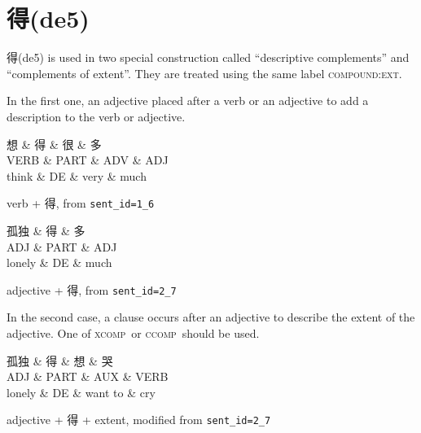 \documentclass[UTF8,oneside]{book}
\def\ccomp{\textsc{ccomp}}
\def\xcomp{\textsc{xcomp}}
\begin{document}
\newpage
\section{得(de5)}

得(de5) is used in two special construction called ``descriptive complements'' and ``complements of extent''. They are treated using the same label \textsc{compound:ext}.

In the first one, an adjective placed after a verb or an adjective to add a description to the verb or adjective. 

\begin{tree}[h]
\centering
\begin{dependency}[theme=simple]
\begin{deptext}[column sep=.5cm, row sep=.5ex]
想  \& 得 \& 很 \& 多 \\
VERB \& PART \& ADV \& ADJ \\
think \& DE \& very \& much \\
\end{deptext}
\end{dependency}
\caption{verb + 得, from \texttt{sent\_id=1\_6}}
\end{tree}

\begin{tree}[h]
\centering
\begin{dependency}[theme=simple]
\begin{deptext}[column sep=.5cm, row sep=.5ex]
孤独  \& 得 \& 多 \\
ADJ \& PART \& ADJ \\
lonely \& DE \& much \\
\end{deptext}
\end{dependency}
\caption{adjective + 得, from \texttt{sent\_id=2\_7}}
\end{tree}

In the second case, a clause occurs after an adjective to describe the extent of the adjective. One of \xcomp\ or \ccomp\ should be used. 

\begin{tree}[h]
\centering
\begin{dependency}[theme=simple]
\begin{deptext}[column sep=.5cm, row sep=.5ex]
孤独  \& 得 \& 想  \& 哭 \\
ADJ \& PART \& AUX \& VERB \\
lonely \& DE \& want to \& cry \\
\end{deptext}
\end{dependency}
\caption{adjective + 得 + extent, modified from \texttt{sent\_id=2\_7}}
\end{tree}
\end{document}
